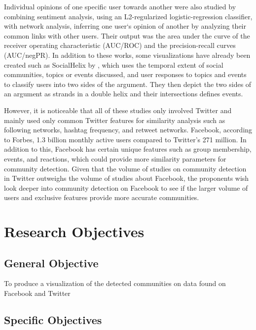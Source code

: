 Individual opinions of one specific user towards another were also studied by  combining sentiment analysis, using an L2-regularized logistic-regression classifier, with network analysis, inferring one user`s opinion of another by analyzing their common links with other users. Their output was the area under the curve of the receiver operating characteristic (AUC/ROC) and the precision-recall curves (AUC/negPR). In addition to these works, some visualizations have already been created such as SocialHelix by , which uses the temporal extent of social communities, topics or events discussed, and user responses to topics and events to classify users into two sides of the argument. They then depict the two sides of an argument as strands in a double helix and their intersections defines events.

However, it is noticeable that all of these studies only involved Twitter and mainly used only common Twitter features for similarity analysis such as following networks, hashtag frequency, and retweet networks. Facebook, according to Forbes, 1.3 billion monthly active users compared to Twitter's 271 million. In addition to this, Facebook has certain unique features such as group membership, events, and reactions, which could provide more similarity parameters for community detection. Given that the volume of studies on community detection in Twitter outweighs the volume of studies about Facebook, the proponents wish look deeper into community detection on Facebook to see if the larger volume of users and exclusive features provide more accurate communities.

\section{Research Objectives}
\label{sec:researchobjectives}

\subsection{General Objective}
\label{sec:generalobjective}

To produce a visualization of the detected communities on data found on Facebook and Twitter

\subsection{Specific Objectives}
\label{sec:specificobjectives}


